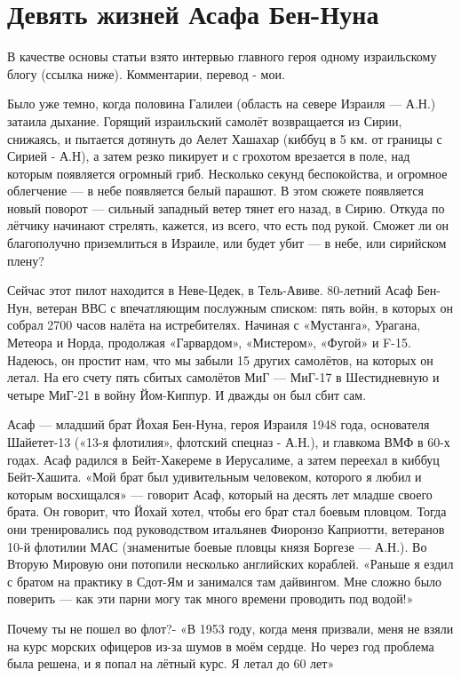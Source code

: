 \chapter{Девять жизней Асафа Бен-Нуна}

В качестве основы статьи взято интервью главного героя одному израильскому блогу (ссылка ниже). Комментарии, перевод - мои.

Было уже темно, когда половина Галилеи (область на севере Израиля — А.Н.) затаила дыхание. Горящий израильский самолёт возвращается из Сирии, снижаясь, и пытается дотянуть до Аелет Хашахар (киббуц в 5 км. от границы с Сирией - А.Н), а затем резко пикирует и с грохотом врезается в поле, над которым появляется огромный гриб. Несколько секунд беспокойства, и огромное облегчение — в небе появляется белый парашют. В этом сюжете появляется новый поворот — сильный западный ветер тянет его назад, в Сирию. Откуда по лётчику начинают стрелять, кажется, из всего, что есть под рукой. Сможет ли он благополучно приземлиться в Израиле, или будет убит — в небе, или сирийском плену?

Сейчас этот пилот находится в Неве-Цедек, в Тель-Авиве. 80-летний Асаф Бен-Нун, ветеран ВВС с впечатляющим послужным списком: пять войн, в которых он собрал 2700 часов налёта на истребителях. Начиная с «Мустанга», Урагана, Метеора и Норда, продолжая «Гарвардом», «Мистером», «Фугой» и F-15. Надеюсь, он простит нам, что мы забыли 15 других самолётов, на которых он летал. На его счету пять сбитых самолётов МиГ — МиГ-17 в Шестидневную и четыре МиГ-21 в войну Йом-Киппур. И дважды он был сбит сам.

Асаф — младший брат Йохая Бен-Нуна, героя Израиля 1948 года, основателя Шайетет-13 («13-я флотилия», флотский спецназ - А.Н.), и главкома ВМФ в 60-х годах. Асаф радился в Бейт-Хакереме в Иерусалиме, а затем переехал в киббуц Бейт-Хашита. «Мой брат был удивительным человеком, которого я любил и которым восхищался» — говорит Асаф, который на десять лет младше своего брата. Он говорит, что Йохай хотел, чтобы его брат стал боевым пловцом. Тогда они тренировались под руководством итальянев Фиоронзо Каприотти, ветеранов 10-й флотилии МАС (знаменитые боевые пловцы князя Боргезе — А.Н.). Во Вторую Мировую они потопили несколько английских кораблей. «Раньше я ездил с братом на практику в Сдот-Ям и занимался там дайвингом. Мне сложно было поверить — как эти парни могу так много времени проводить под водой!»

Почему ты не пошел во флот?- «В 1953 году, когда меня призвали, меня не взяли на курс морских офицеров из-за шумов в моём сердце. Но через год проблема была решена, и я попал на лётный курс. Я летал до 60 лет»

